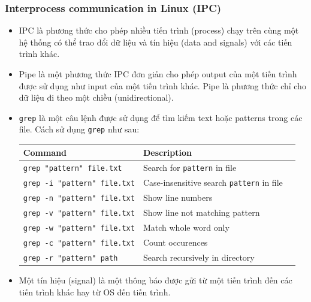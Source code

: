 \documentclass{article}
\begin{document}
    \subsubsection{Interprocess communication in Linux (IPC)}
    \begin{itemize}
        \item IPC là phương thức cho phép nhiều tiến trình (process) chạy trên cùng một hệ thống có thể trao đổi dữ liệu và tín hiệu (data and signals) với các tiến trình khác.
        \item Pipe là một phương thức IPC đơn giản cho phép output của một tiến trình được sử dụng như input của một tiến trình khác. Pipe là phương thức chỉ cho dữ liệu đi theo một chiều (unidirectional).
        \item \verb|grep| là một câu lệnh được sử dụng để tìm kiếm text hoặc patterns trong các file. Cách sử dụng \verb|grep| như sau:
       \\ \begin{center}
        \begin{tabular}{| l | l | l|}
            \hline
            Command & Description \\
            \hline
            \verb|grep "pattern" file.txt|& Search for \verb|pattern| in file \\
            \hline
            \verb|grep -i "pattern" file.txt|& Case-insensitive search \verb|pattern| in file \\
            \hline
            \verb|grep -n "pattern" file.txt|& Show line numbers \\
            \hline
            \verb|grep -v "pattern" file.txt|& Show line not matching pattern \\
            \hline
            \verb|grep -w "pattern" file.txt|& Match whole word only \\
            \hline
            \verb|grep -c "pattern" file.txt|& Count occurences \\
            \hline
            \verb|grep -r "pattern" path|& Search recursively in directory \\
            \hline
        \end{tabular}
        \end{center}
        \item Một tín hiệu (signal) là một thông báo được gửi từ một tiến trình đến các tiến trình khác hay từ OS đến tiến trình.
       \\ \begin{center}
       \begin{tabular}{|l | l| l|}

\end{tabular}
\end{center}
\end{itemize}
\end{document}
